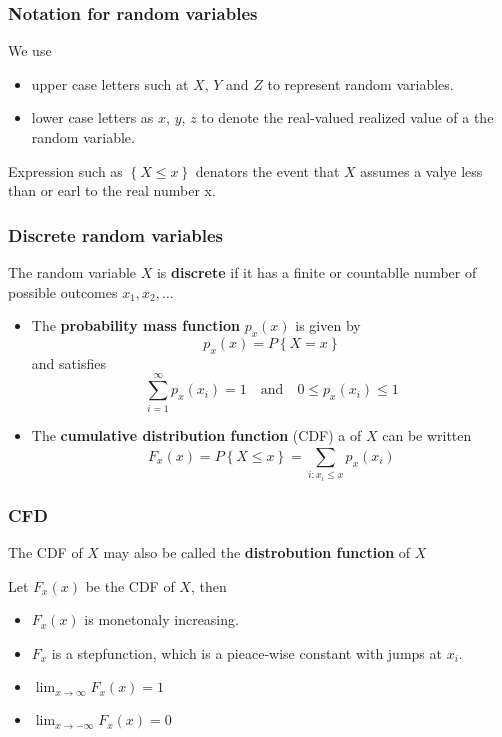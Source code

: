 \documentclass{article}
\theoremstyle{remark}
\begin{document}
\subsubsection{Notation for random variables}%
\label{ssub:notation_for_random_variables}

We use
\begin{itemize}
  \item upper case letters such at $X$, $Y$ and $Z$  to represent random variables.
  \item lower case letters as $x$, $y$, $z$ to denote the real-valued realized value of a the random variable.
\end{itemize}

Expression such as $\left\{ X \le x \right\}$ denators the event that $X$ assumes a valye less than or earl to the real number x.

\subsubsection{Discrete random variables}%
\label{ssub:discrete_random_variables}

The random variable $X$ is \textbf{discrete}  if it has a finite or countablle number of possible outcomes $x_{1}, x_{2}, \ldots$ \par
\begin{itemize}
  \item The \textbf{probability mass function } $p_{x} \left( x \right) $ is given by \[
  p_{x}\left( x \right) = P \left\{ X = x \right\}
  \] and satisfies \[
  \sum_{i=1}^{\infty} p_{x}\left( x_{i} \right) = 1 \quad  \text{and} \quad  0\le p_{x} \left( x_{i} \right) \le  1
  \]
\item The \textbf{cumulative distribution function} (CDF) a of $X$ can be written \[
F_{x}\left( x \right) = P\left\{ X \le x \right\} = \sum_{i: x_{i} \le x}^{} p_{x}\left( x_{i} \right)
\]
\end{itemize}

\subsubsection{CFD}%
\label{ssub:cfd}

The CDF of $X$ may also be called the \textbf{distrobution function}  of $X$ \par
Let $F_{x}\left( x \right)$ be the CDF of $X$, then
\begin{itemize}
  \item $F_{x}\left( x \right)$ is monetonaly increasing.
  \item $F_{x}$ is a stepfunction, which is a pieace-wise constant with jumps at $x_{i}.$
  \item $\lim_{x \to \infty} F_{x}\left( x \right) = 1$
  \item $\lim_{x \to - \infty} F_{x}\left( x \right) = 0$
\end{itemize}
\end{document}
